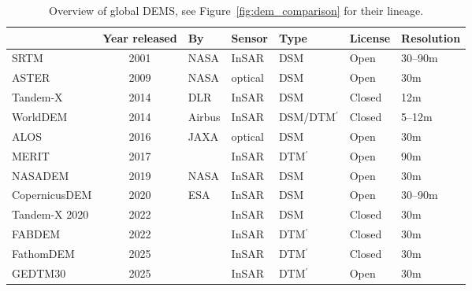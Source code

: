 \begin{table}[]
  \begin{tabular}{@{}lclllll@{}}
    \toprule
    & Year released & By                 & Sensor  & Type               & License & Resolution \\
    \midrule
    SRTM          & 2001          & NASA               & InSAR   & DSM                & Open    & 30--90m    \\
    ASTER         & 2009          & NASA               & optical & DSM                & Open    & 30m        \\
    Tandem-X      & 2014          & DLR                & InSAR   & DSM                & Closed  & 12m        \\
    WorldDEM      & 2014          & Airbus             & InSAR   & DSM/DTM$^{\prime}$ & Closed  & 5--12m     \\
    ALOS          & 2016          & JAXA               & optical & DSM                & Open    & 30m        \\
    MERIT         & 2017          & \citet{Yamazaki17} & InSAR   & DTM$^{\prime}$     & Open    & 90m        \\
    NASADEM       & 2019          & NASA               & InSAR   & DSM                & Open    & 30m        \\
    CopernicusDEM & 2020          & ESA                & InSAR   & DSM                & Open    & 30--90m    \\
    Tandem-X 2020        & 2022          & \citet{wesselNewTanDEMX20202022}   & InSAR   & DSM     & Closed  & 30m        \\
    FABDEM        & 2022          & \citet{Hawker22}   & InSAR   & DTM$^{\prime}$     & Closed  & 30m        \\
    FathomDEM        & 2025          & \citet{uheFathomDEMImprovedGlobal2025}   & InSAR   & DTM$^{\prime}$     & Closed  & 30m        \\
    GEDTM30        & 2025          & \citet{hoGEDTM30GlobalEnsemble2025}   & InSAR   & DTM$^{\prime}$     & Open  & 30m        \\
    \bottomrule
  \end{tabular}
  \caption{Overview of global DEMS, see Figure~\ref{fig:dem_comparison} for their lineage.}%
  \label{tab:gdem_overview}
\end{table}


